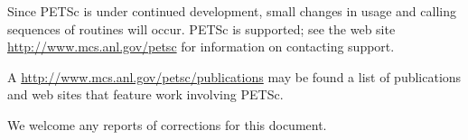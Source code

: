Since PETSc is under continued development, small changes in usage and
calling sequences of routines will occur.  PETSc is supported; see the
web site \href{http://www.mcs.anl.gov/petsc}{http://www.mcs.anl.gov/petsc} for information on
contacting support.

A \href{http://www.mcs.anl.gov/petsc/publications}{http://www.mcs.anl.gov/petsc/publications} may be found 
a list of publications and web sites that feature work involving PETSc.


We welcome any reports of corrections for this document.

\medskip \medskip



